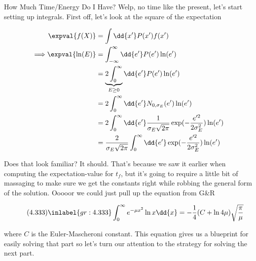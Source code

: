 \begin{answer}
\begin{answerpart}{How Much Time/Energy Do I Have?}
    Welp, no time like the present, let's start setting up integrals.
    First off, let's look at the square of the expectation

    \begin{equation}
      \begin{alignedat}{2}
        &&\expval{f(X)} &= \int \dd{x'} P(x')f(x')
        \\
        \implies && \expval{\ln(E)}
        &=
        \int_{-\infty}^{\infty} \dd{e'}
        P(e')\ln(e')
        \\
        &&&=
        \underbrace{2\int_{0}^{\infty}}_{E \ge 0} \dd{e'}
        P(e')\ln(e')
        \\
        &&&=
        2\int_0^\infty \dd{e'}
        N_{0,\sigma_E}(e')\ln(e')
        \\
        &&&=
        2\int_0^\infty \dd{e'}
        \frac{1}{\sigma_E\sqrt{2\pi}}
        \exp(-\frac{e'^2}{2\sigma_E^2})
        \ln(e')
        \\
        &&&=
        \frac{2}{\sigma_E\sqrt{2\pi}}
        \int_0^\infty \dd{e'}
        \exp(-\frac{e'^2}{2\sigma_E^2})
        \ln(e')
        \\
      \end{alignedat}
    \end{equation}

    Does that look familiar?  It should.  That's because we saw it
    earlier when computing the expectation-value for $t_f$, but it's
    going to require a little bit of massaging to make sure we get the
    constants right while robbing the general form of the solution.
    Ooooor we could just pull up the equation from G\&R

    \begin{equation}
      \tag{4.333}
      \inlabel{gr:4.333}
      \int_0^\infty e^{-\mu x^2}\ln x \dd{x}
      = - \frac{1}{4}
      (C + \ln 4\mu)\sqrt{\frac{\pi}{\mu}}
    \end{equation}\cite[eq4.333]{gr}

    where $C$ is the Euler-Mascheroni constant.  This equation gives
    us a blueprint for easily solving that part so let's turn our
    attention to the strategy for solving the next part.


\end{answerpart}
\end{answer}
